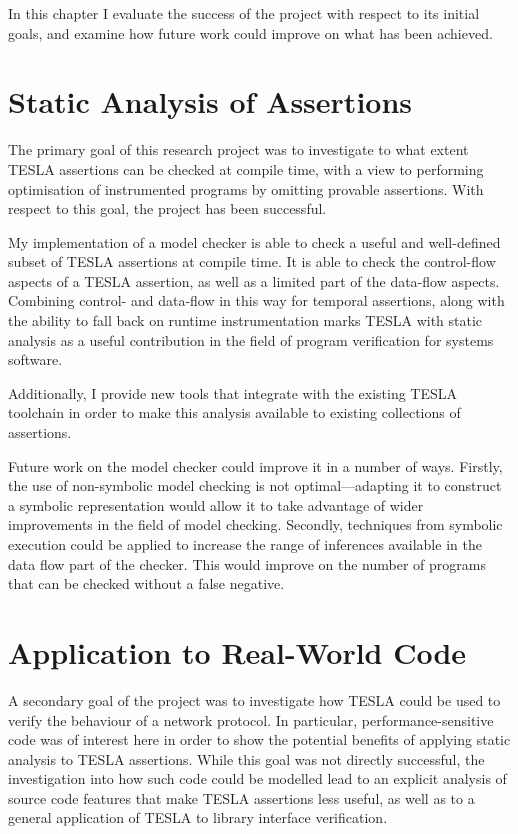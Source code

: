 In this chapter I evaluate the success of the project with respect to its
initial goals, and examine how future work could improve on what has been
achieved.

\section{Static Analysis of Assertions}

The primary goal of this research project was to investigate to what extent
TESLA assertions can be checked at compile time, with a view to performing
optimisation of instrumented programs by omitting provable assertions. With
respect to this goal, the project has been successful.

My implementation of a model checker is able to check a useful and well-defined
subset of TESLA assertions at compile time. It is able to check the control-flow
aspects of a TESLA assertion, as well as a limited part of the data-flow
aspects. Combining control- and data-flow in this way for temporal assertions,
along with the ability to fall back on runtime instrumentation marks TESLA with
static analysis as a useful contribution in the field of program verification
for systems software.

Additionally, I provide new tools that integrate with the existing TESLA
toolchain in order to make this analysis available to existing collections of
assertions.

Future work on the model checker could improve it in a number of ways. Firstly,
the use of non-symbolic model checking is not optimal---adapting it to construct
a symbolic representation would allow it to take advantage of wider improvements
in the field of model checking. Secondly, techniques from symbolic execution
could be applied to increase the range of inferences available in the data flow
part of the checker. This would improve on the number of programs that can be
checked without a false negative.

\section{Application to Real-World Code}

A secondary goal of the project was to investigate how TESLA could be used to
verify the behaviour of a network protocol. In particular, performance-sensitive
code was of interest here in order to show the potential benefits of applying
static analysis to TESLA assertions. While this goal was not directly
successful, the investigation into how such code could be modelled lead to an
explicit analysis of source code features that make TESLA assertions less
useful, as well as to a general application of TESLA to library interface
verification.

